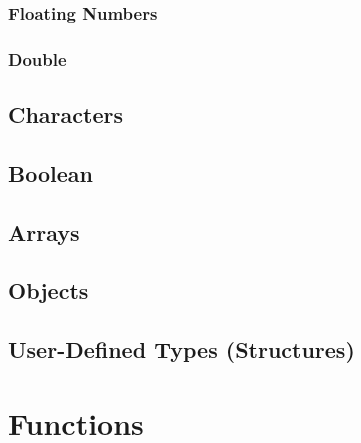 \documentclass[12pt]{report}
\begin{document}
	\subsubsection{Floating Numbers}
	\subsubsection{Double}
	\subsection{Characters}
	\subsection{Boolean}
	\subsection{Arrays}
	\subsection{Objects}
	\subsection{User-Defined Types (Structures)}
	
	\section{Functions}
	\label{sec:function}
	
\end{document}
